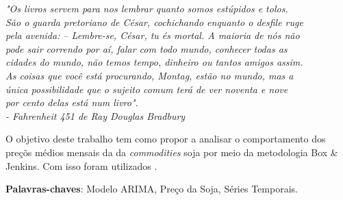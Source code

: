 \documentclass[
	12pt,				%
	openright,			%
	oneside,      %
	a4paper,			%
	english,			%
	french,				%
	spanish,			%
	brazil,				%
	]{abntex2}\usepackage[]{graphicx}\usepackage[]{xcolor}
\begin{document}

\frenchspacing


\imprimircapa

\imprimirfolhaderosto
\clearpage

\begin{epigrafe} 
  \vspace*{\fill} 
  \begin{flushright} 
  \textit{"Os livros servem para nos lembrar quanto somos estúpidos e tolos. 
      \\ São o guarda pretoriano de César, cochichando enquanto o desfile ruge 
      \\ pela avenida: – Lembre-se, César, tu és mortal. A maioria de nós não 
      \\ pode sair correndo por aí, falar com todo mundo, conhecer todas as 
      \\ cidades do mundo, não temos tempo, dinheiro ou tantos amigos assim. 
      \\ As coisas que você está procurando, Montag, estão no mundo, mas a 
      \\ única possibilidade que o sujeito comum terá de ver noventa e nove 
      \\ por cento delas está num livro". 
      \\ - Fahrenheit 451 de Ray Douglas Bradbury} 
  \end{flushright} 
\end{epigrafe}
\begin{resumo} 
  O objetivo deste trabalho tem como propor a analisar o comportamento dos preçõs
  médios mensais da da \textit{commodities} soja 
  por meio da metodologia Box \& Jenkins. Com isso foram utilizados .
  \vspace{\onelineskip} 
  \noindent
  
  \textbf{Palavras-chaves}: Modelo ARIMA, Preço da Soja, Séries Temporais. 
\end{resumo}
\end{document}
